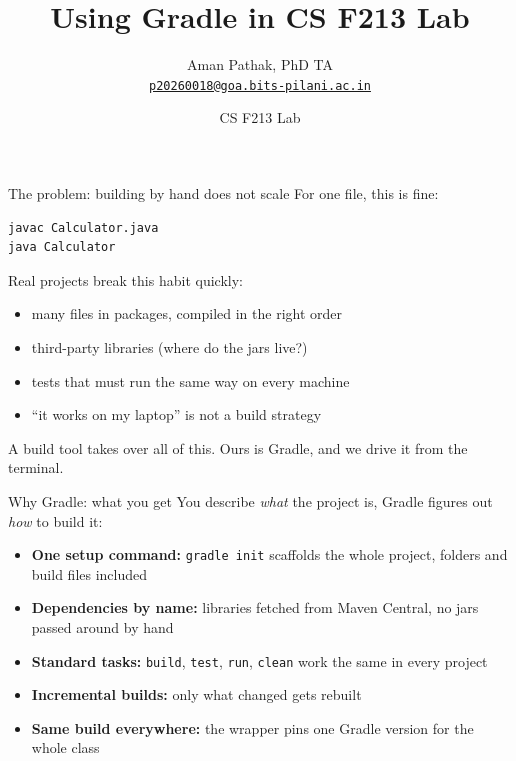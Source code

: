 \documentclass[11pt,aspectratio=169]{beamer}
\title[Gradle in CS F213 Lab]{Using Gradle in CS F213 Lab}
\author[A. Pathak]{Aman Pathak, PhD TA \\ \href{mailto:p20260018@goa.bits-pilani.ac.in}{\texttt{p20260018@goa.bits-pilani.ac.in}}}
\date{CS F213 Lab}
\begin{document}
\begin{frame}[plain]
  \titlepage
\end{frame}

\begin{frame}[fragile]{The problem: building by hand does not scale}
  For one file, this is fine:
  \begin{lstlisting}
javac Calculator.java
java Calculator
  \end{lstlisting}
  Real projects break this habit quickly:
  \begin{itemize}
    \item many files in packages, compiled in the right order
    \item third-party libraries (where do the jars live?)
    \item tests that must run the same way on every machine
    \item ``it works on my laptop'' is not a build strategy
  \end{itemize}
  A build tool takes over all of this. Ours is Gradle, and we drive it
  from the terminal.
\end{frame}

\begin{frame}{Why Gradle: what you get}
  You describe \emph{what} the project is, Gradle figures out \emph{how}
  to build it:
  \begin{itemize}
    \item \textbf{One setup command:} \texttt{gradle init} scaffolds the
      whole project, folders and build files included
    \item \textbf{Dependencies by name:} libraries fetched from Maven
      Central, no jars passed around by hand
    \item \textbf{Standard tasks:} \texttt{build}, \texttt{test},
      \texttt{run}, \texttt{clean} work the same in every project
    \item \textbf{Incremental builds:} only what changed gets rebuilt
    \item \textbf{Same build everywhere:} the wrapper pins one Gradle
      version for the whole class
  \end{itemize}
\end{frame}
\end{document}
